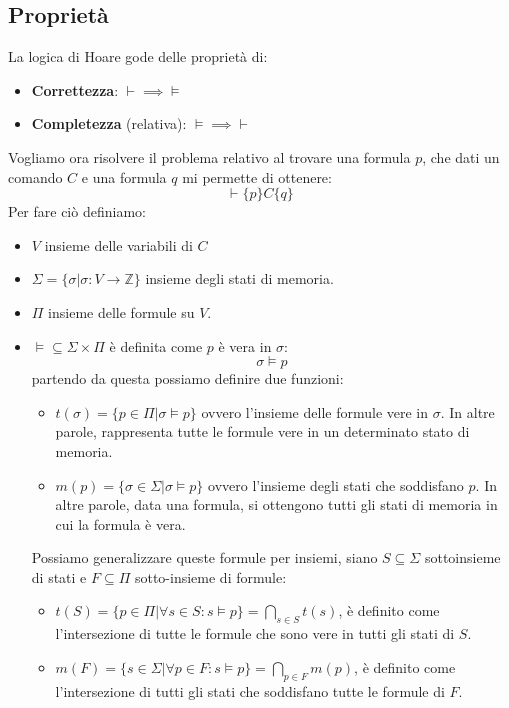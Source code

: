 \subsection{Proprietà}
La logica di Hoare gode delle proprietà di:
\begin{itemize}
    \item \textbf{Correttezza}: $\vdash \implies \models$
    \item \textbf{Completezza} (relativa): $\models \implies \vdash$
\end{itemize}
Vogliamo ora risolvere il problema relativo al trovare una formula $p$, che dati
un comando $C$ e una formula $q$ mi permette di ottenere:
\begin{equation}
    \vdash \{p\} C \{q\}
\end{equation}
Per fare ciò definiamo:
\begin{itemize}
    \item $V$ insieme delle variabili di $C$
    \item $\Sigma = \{\sigma | \sigma: V \to \mathbb{Z} \}$ insieme degli stati
          di memoria.
    \item $\Pi$ insieme delle formule su $V$.
    \item $\models \subseteq \Sigma \times \Pi$ è definita come $p$ è vera in
          $\sigma$:
          \begin{equation}
              \sigma \models p
          \end{equation}
          partendo da questa possiamo definire due funzioni:
          \begin{itemize}
              \item $t(\sigma) = \{p \in \Pi | \sigma \models p \}$ ovvero
                    l'insieme delle formule vere in $\sigma$. In altre parole,
                    rappresenta tutte le formule vere in un determinato stato di
                    memoria.
              \item $m(p) = \{\sigma \in \Sigma | \sigma \models p \}$ ovvero
                    l'insieme degli stati che soddisfano $p$. In altre parole,
                    data una formula, si ottengono tutti gli stati di memoria in
                    cui la formula è vera.
          \end{itemize}
          Possiamo generalizzare queste formule per insiemi, siano $S \subseteq
              \Sigma$ sottoinsieme di stati e $F \subseteq \Pi$ sotto-insieme di
          formule:
          \begin{itemize}
              \item $t(S) = \{p \in \Pi | \forall s \in S: s \models p \} =
                        \bigcap_{s \in S} t(s)$, è definito come l'intersezione
                    di tutte le formule che sono vere in tutti gli stati di $S$.
              \item $m(F) = \{s \in \Sigma | \forall p \in F: s \models p\} =
                        \bigcap_{p \in F} m(p)$, è definito come l'intersezione
                    di tutti gli stati che soddisfano tutte le formule di $F$.
          \end{itemize}
\end{itemize}
